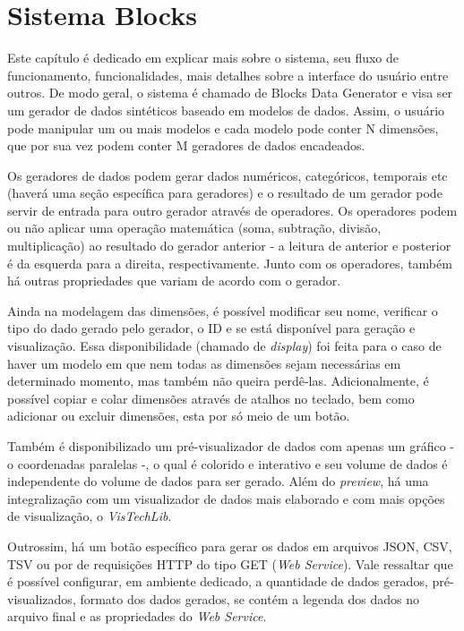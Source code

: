 \documentclass[
	12pt,				%
	openright,			%
	twoside,			%
	a4paper,			%
	english,			%
	brazil				%
	]{abntex2}
\begin{document}
\chapter{Sistema Blocks}
	Este capítulo é dedicado em explicar mais sobre o sistema, seu fluxo de funcionamento, funcionalidades, mais detalhes sobre a interface do usuário entre outros.
	De modo geral, o sistema é chamado de Blocks Data Generator e visa ser um gerador de dados sintéticos baseado em modelos de dados.
	Assim, o usuário pode manipular um ou mais modelos e cada modelo pode conter N dimensões, que por sua vez podem conter M geradores de dados encadeados.
	\par
	Os geradores de dados podem gerar dados numéricos, categóricos, temporais etc (haverá uma seção específica para geradores) e o resultado de um gerador pode servir de entrada para outro gerador através de operadores.
	Os operadores podem ou não aplicar uma operação matemática (soma, subtração, divisão, multiplicação) ao resultado do gerador anterior - a leitura de anterior e posterior é da esquerda para a direita, respectivamente.
	Junto com os operadores, também há outras propriedades que variam de acordo com o gerador.
	\par
	Ainda na modelagem das dimensões, é possível modificar seu nome, verificar o tipo do dado gerado pelo gerador, o ID e se está disponível para geração e visualização.
	Essa disponibilidade (chamado de \emph{display}) foi feita para o caso de haver um modelo em que nem todas as dimensões sejam necessárias em determinado momento, mas também não queira perdê-las.
	Adicionalmente, é possível copiar e colar dimensões através de atalhos no teclado, bem como adicionar ou excluir dimensões, esta por só meio de um botão.
	\par
	Também é disponibilizado um pré-visualizador de dados com apenas um gráfico - o coordenadas paralelas -, o qual é colorido e interativo e seu volume de dados é independente do volume de dados para ser gerado.
	Além do \emph{preview}, há uma integralização com um visualizador de dados mais elaborado e com mais opções de visualização, o \emph{VisTechLib}.
	\par
	Outrossim, há um botão específico para gerar os dados em arquivos JSON, CSV, TSV ou por de requisições HTTP do tipo GET (\emph{Web Service}).
	Vale ressaltar que é possível configurar, em ambiente dedicado, a quantidade de dados gerados, pré-visualizados, formato dos dados gerados, se contém a legenda dos dados no arquivo final e as propriedades do \emph{Web Service}.
\end{document}
